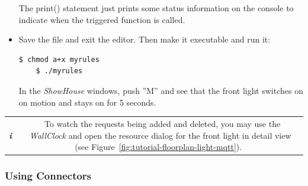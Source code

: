 \documentclass[12pt,english,parskip=half,headheight=19pt]{scrreprt}
\newcommand{\lstf}[1]{\colorbox{lstbackground}{\ttfamily\footnotesize#1}}
\newcommand{\infobox}[1]{
  \par
  \medskip
  \hfill
  \setlength\arrayrulewidth{1pt}
  \begin{tabular}[t]{c|c|}
    \parbox{1.8em}{\hfill\textit{\Huge\textbf{i}\,}}
    &
    \,\parbox{0.89\linewidth}{\setlength{\parskip}{0.5em} \small #1}\,
  \end{tabular}
  \medskip
  \par
}
\begin{document}
\begin{itemize}[$\blacktriangleright$]
  The \lstf{print()} statement just prints some status information on the console to indicate when the
  triggered function is called.

\item
  Save the file and exit the editor. Then make it executable and run it:
  \begin{lstlisting}[language=bash]
    $ chmod a+x myrules
    $ ./myrules
  \end{lstlisting}
  In the \textit{ShowHouse} windows, push ''M'' and see that the front light switches on on
  motion and stays on for 5 seconds.

\end{itemize}

\infobox{
  To watch the requests being added and deleted, you may use the \textit{WallClock} and open the resource
  dialog for the front light in detail view (see Figure~\ref{fig:tutorial-floorplan-light-mqtt}).
}


\subsubsection*{Using Connectors}
\end{document}
